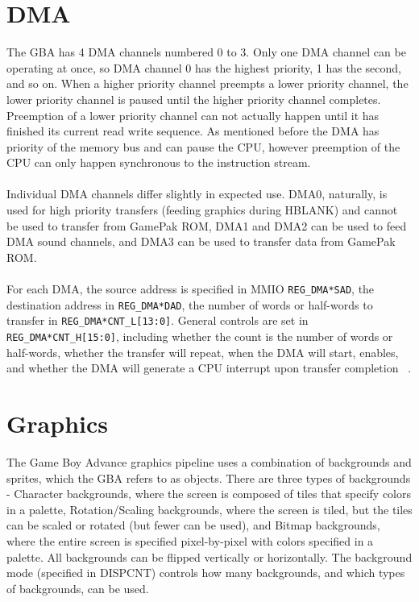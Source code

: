 \documentclass[11pt,a4paper]{article}
\begin{document}
	\section{DMA}
	The GBA has 4 DMA channels numbered 0 to 3. Only one DMA channel can be operating at once, so DMA channel 0 has the highest priority, 1 has the second, and so on. When a higher priority channel preempts a lower priority channel, the lower priority channel is paused until the higher priority channel completes. Preemption of a lower priority channel can not actually happen until it has finished its current read write sequence.  As mentioned before the DMA has priority of the memory bus and can pause the CPU, however preemption of the CPU can only happen synchronous to the instruction stream.\\\\
	Individual DMA channels differ slightly in expected use. DMA0, naturally, is used for high priority transfers (feeding graphics during HBLANK) and cannot be used to transfer from GamePak ROM, DMA1 and DMA2 can be used to feed DMA sound channels, and DMA3 can be used to transfer data from GamePak ROM.\\\\
	For each DMA, the source address is specified in MMIO \texttt{REG\_DMA*SAD}, the destination address in \texttt{REG\_DMA*DAD}, the number of words or half-words to transfer in \texttt{REG\_DMA*CNT\_L[13:0]}.
	General controls are set in \texttt{REG\_DMA*CNT\_H[15:0]}, including whether the count is the number of words or half-words, whether the transfer will repeat, when the DMA will start, enables, and whether the DMA will generate a CPU interrupt upon transfer completion ~\cite{GBAManual}.
	
	\section{Graphics}
	The Game Boy Advance graphics pipeline uses a combination of backgrounds and sprites, which the GBA refers to as objects. There are three types of backgrounds - Character backgrounds, where the screen is composed of tiles that specify colors in a palette, Rotation/Scaling backgrounds, where the screen is tiled, but the tiles can be scaled or rotated (but fewer can be used), and Bitmap backgrounds, where the entire screen is specified pixel-by-pixel with colors specified in a palette. All backgrounds can be flipped vertically or horizontally. The background mode (specified in DISPCNT) controls how many backgrounds, and which types of backgrounds, can be used. \cite{GBAManual}
	
\end{document}
